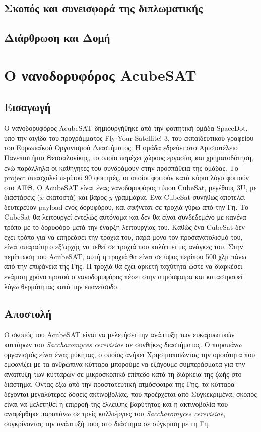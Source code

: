\documentclass[a4paper,nobib,justified]{tufte-book}
\begin{document}
\section{Σκοπός και συνεισφορά της διπλωματικής}
\section{Διάρθρωση και Δομή}

\chapter{Ο νανοδορυφόρος AcubeSAT}
\section{Εισαγωγή}
Ο νανοδορυφόρος AcubeSAT δημιουργήθηκε από την φοιτητική ομάδα SpaceDot, υπό την αιγίδα του προγράμματος Fly Your Satellite! 3, του εκπαιδευτικού γραφείου του Ευρωπαϊκού Οργανισμού Διαστήματος. Η ομάδα εδρεύει στο Αριστοτέλειο Πανεπιστήμιο Θεσσαλονίκης, το οποίο παρέχει χώρους εργασίας και χρηματοδότηση, ενώ παράλληλα οι καθηγητές του συνδράμουν στην προσπάθεια της ομάδας. Το project απασχολεί περίπου 90 φοιτητές, οι οποίοι φοιτούν κατά κύριο λόγο φοιτούν στο ΑΠΘ. Ο AcubeSAT είναι ένας νανοδορυφόρος τύπου CubeSat, μεγέθους 3U, με διαστάσεις ($x$ εκατοστά) και βάρος $y$ γραμμάρια. Ένα CubeSat συνήθως αποτελεί δευτερεύον payload ενός δορυφόρου, και \emph{αφήνεται} σε τροχιά γύρω από την Γη. Το CubeSat θα λειτουργεί εντελώς αυτόνομα και δεν θα είναι συνδεδεμένο με κανένα τρόπο με το δορυφόρο μετά την έναρξη λειτουργίας του. Καθώς ένα CubeSat δεν έχει τρόπο για να επηρεάσει την τροχιά του, παρά μόνο τον προσανατολισμό του, είναι απαραίτητο εξ'αρχής να τεθεί σε τροχιά που καλύπτει τις ανάγκες του. Στην περίπτωση του AcubeSAT, αυτή η τροχιά θα είναι σε ύψος περίπου 500 χλμ πάνω από την επιφάνεια της Γης. Η τροχιά θα έχει αρκετή ταχύτητα ώστε να διαρκέσει ενάμιση χρόνο προτού ο νανοδορυφόρος πέσει στην ατμόσφαιρα και καταστραφεί λόγω θερμότητας κατά την επανείσοδο.

\section{Αποστολή}
Ο σκοπός του AcubeSAT είναι να μελετήσει την ανάπτυξη των ευκαρυωτικών κυττάρων του \emph{Saccharomyces cerevisiae} σε συνθήκες διαστήματος. Ο παραπάνω οργανισμός είναι ένας μύκητας, ο οποίος ανήκει %
Χρησιμοποιώντας την ομοιότητα που εμφανίζει με τα ανθρώπινα κύτταρα μπορούμε να εξάγουμε συμπεράσματα για την ανάπτυξη των κυττάρων σε μικροσκοπικό επίπεδο κατά τη διάρκεια της ζωής στο διάστημα. Όντας έξω από την προστατευτική ατμόσφαιρα της Γης, τα κύτταρα δέχονται μεγαλύτερες δόσεις ακτινοβολίας, που προέρχεται από %
Συγκεκριμένα, σκοπός είναι να μελετηθεί η επιρροή της έλλειψης βαρύτητας και η ακτινοβολία που αναφέρθηκε παραπάνω σε τρείς καλλιέργιες του \emph{Saccharomyces cerevisiae}, συγκρίνοντας την ανάπτυξή τους στο διάστημα σε σύγκριση με τη Γη.
\end{document}
